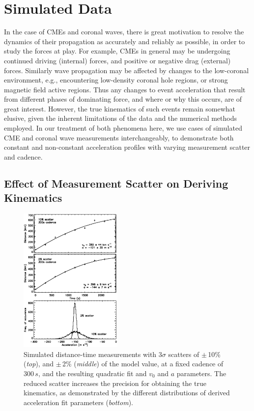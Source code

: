 \documentclass[structabstract]{aa}
\begin{document}
\section{Simulated Data}
\label{sect:simul1}

In the case of CMEs and coronal waves, there is great motivation to resolve the dynamics of their propagation as accurately and reliably as possible, in order to study the forces at play. For example, CMEs in general may be undergoing continued driving (internal) forces, and positive or negative drag (external) forces. Similarly wave propagation may be affected by changes to the low-coronal environment, e.g., encountering low-density coronal hole regions, or strong magnetic field active regions. Thus any changes to event acceleration that result from different phases of dominating force, and where or why this occurs, are of great interest. However, the true kinematics of such events remain somewhat elusive, given the inherent limitations of the data and the numerical methods employed. In our treatment of both phenomena here, we use cases of simulated CME and coronal wave measurements interchangeably, to demonstrate both constant and non-constant acceleration profiles with varying measurement scatter and cadence.


\subsection{Effect of Measurement Scatter on Deriving Kinematics}
\label{subsect:noise}

\begin{figure}[!t]
\begin{center}
\includegraphics[width = 0.45\textwidth]{images/noise_hist_weight.eps}
\caption{Simulated distance-time measurements with 3$\sigma$ scatters of $\pm$\,10\% (\emph{top}), and $\pm$\,2\% (\emph{middle}) of the model value, at a fixed cadence of $300\,s$, and the resulting quadratic fit and $v_0$ and $a$ parameters. The reduced scatter increases the precision for obtaining the true kinematics, as demonstrated by the different distributions of derived acceleration fit parameters (\emph{bottom}).}
\label{noise_hist_weight}
\end{center}
\end{figure}
\end{document}
